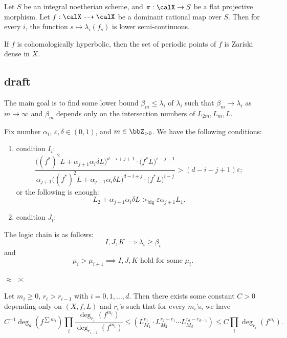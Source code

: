   \begin{mainthm}\label{mainthm:semi-continuity}
    Let $S$ be an integral noetherian scheme, and $\pi: \calX \to S$ be a flat projective morphism. 
    Let $f: \calX \dashrightarrow \calX$ be a dominant rational map over $S$.
    Then for every $i$, the function $s \mapsto \lambda_i(f_s)$ is lower semi-continuous.
  \end{mainthm}

  \begin{mainthm}
    If $f$ is cohomologically hyperbolic, then the set of periodic points of $f$ is Zariski dense in $X$.
  \end{mainthm}


\subsection{draft}


  The main goal is to find some lower bound $\beta_m \leq \lambda_i$ of $\lambda_i$ such that $\beta_m \to \lambda_i$ as $m \to \infty$ and $\beta_m$ depends only on the intersection numbers of $L_{2m}, L_m, L$.


  Fix number $\alpha_i$, $\varepsilon, \delta \in (0, 1)$, and $m \in \bbZ_{>0}$. 
  We have the following conditions:
  \begin{enumerate}
    \item condition $I_i$:
      \[ \frac{\bigl((f^*)^2L+\alpha_{j+1}\alpha_{i}\delta L\bigr)^{d-i+j+1} \cdot \bigl(f^*L\bigr)^{i-j-1}}{\alpha_{j+1}\bigl((f^*)^2L+\alpha_{j+1}\alpha_{i}\delta L\bigr)^{d-i+j} \cdot \bigl(f^*L\bigr)^{i-j}} > (d-i-j+1) \varepsilon; \]
      or the following is enough:
      \[ L_2 + \alpha_{j+1}\alpha_{i}\delta L >_{\text{big}} \varepsilon \alpha_{j+1} L_1. \]
    \item condition $J_i$:
  \end{enumerate}


  The logic chain is as follows:
  \[ I,J,K \implies \lambda_i \geq \beta_i \]
  and 
  \[ \mu_i > \mu_{i+1} \implies I,J,K \text{ hold for some } \mu_i. \]

  $\approx$ $\asymp$


  \begin{proposition}
    \Yang{}
    Let $m_i \geq 0$, $r_i > r_{i-1}$ with $i = 0, 1, \ldots, d$.
    Then there exists some constant $C > 0$ depending only on $(X,f,L)$ and $r_i$'s such that for every $m_i$'s, we have
    \[ C^{-1} \deg_d(f^{\sum m_i}) \prod_i \frac{\deg_{r_i}(f^{m_i})}{\deg_{r_{i-1}}(f^{m_i})} \leq (L_{M_1}^{r_1} \cdot L_{M_2}^{r_2 - r_1} \cdots L_{M_d}^{r_d - r_{d-1}}) \leq C \prod_i \deg_{r_i}(f^{m_i}). \]
  \end{proposition}

